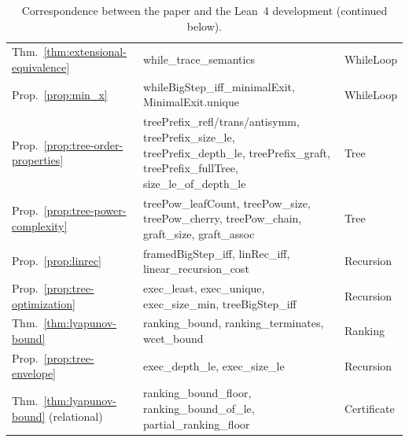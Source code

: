 \documentclass[oneside,english]{amsart}
\numberwithin{equation}{section}
\numberwithin{figure}{section}
\theoremstyle{plain}
\theoremstyle{definition}
\theoremstyle{plain}
\theoremstyle{remark}
\theoremstyle{plain}
\theoremstyle{definition}
\theoremstyle{plain}
\theoremstyle{remark}
\newcommand{\lean}[1]{{\ttfamily\small #1}}
\begin{document}
\begin{table}[p]
\begin{tabular}{@{}>{\raggedright\arraybackslash}p{}>{\raggedright\arraybackslash}p{}>{\raggedright\arraybackslash}p{}@{}}
Thm.~\ref{thm:extensional-equivalence} & \lean{while\_\allowbreak trace\_\allowbreak semantics} & \lean{WhileLoop} \\
Prop.~\ref{prop:min_x} & \lean{whileBigStep\_\allowbreak iff\_\allowbreak minimalExit}, \lean{MinimalExit.\allowbreak unique} & \lean{WhileLoop} \\
Prop.~\ref{prop:tree-order-properties} & \lean{treePrefix\_\allowbreak refl/\allowbreak trans/\allowbreak antisymm}, \lean{treePrefix\_\allowbreak size\_\allowbreak le}, \lean{treePrefix\_\allowbreak depth\_\allowbreak le}, \lean{treePrefix\_\allowbreak graft}, \lean{treePrefix\_\allowbreak fullTree}, \lean{size\_\allowbreak le\_\allowbreak of\_\allowbreak depth\_\allowbreak le} & \lean{Tree} \\
Prop.~\ref{prop:tree-power-complexity} & \lean{treePow\_\allowbreak leafCount}, \lean{treePow\_\allowbreak size}, \lean{treePow\_\allowbreak cherry}, \lean{treePow\_\allowbreak chain}, \lean{graft\_\allowbreak size}, \lean{graft\_\allowbreak assoc} & \lean{Tree} \\
Prop.~\ref{prop:linrec} & \lean{framedBigStep\_\allowbreak iff}, \lean{linRec\_\allowbreak iff}, \lean{linear\_\allowbreak recursion\_\allowbreak cost} & \lean{Recursion} \\
Prop.~\ref{prop:tree-optimization} & \lean{exec\_\allowbreak least}, \lean{exec\_\allowbreak unique}, \lean{exec\_\allowbreak size\_\allowbreak min}, \lean{treeBigStep\_\allowbreak iff} & \lean{Recursion} \\
Thm.~\ref{thm:lyapunov-bound} & \lean{ranking\_\allowbreak bound}, \lean{ranking\_\allowbreak terminates}, \lean{wcet\_\allowbreak bound} & \lean{Ranking} \\
Prop.~\ref{prop:tree-envelope} & \lean{exec\_\allowbreak depth\_\allowbreak le}, \lean{exec\_\allowbreak size\_\allowbreak le} & \lean{Recursion} \\
Thm.~\ref{thm:lyapunov-bound} (relational) & \lean{ranking\_\allowbreak bound\_\allowbreak floor}, \lean{ranking\_\allowbreak bound\_\allowbreak of\_\allowbreak le}, \lean{partial\_\allowbreak ranking\_\allowbreak floor} & \lean{Certificate} \\
\bottomrule
\end{tabular}
\caption{Correspondence between the paper and the Lean~4 development (continued below).}
\label{tab:lean}
\end{table}
\end{document}

